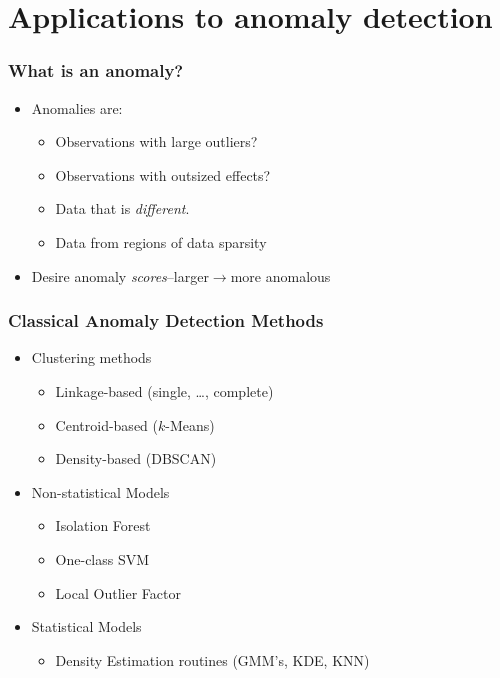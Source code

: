 \documentclass[aspectratio=169]{beamer}
\begin{document}
\section[Anomaly]{Applications to anomaly detection}

\begin{frame}
  \frametitle{What is an anomaly?}
  \begin{itemize}
    \item Anomalies are:
      \begin{itemize}
        \item Observations with large outliers?
        \item Observations with outsized effects?
        \item Data that is \emph{different}.
        \item Data from regions of data sparsity
      \end{itemize}
    \item Desire anomaly \emph{scores}--larger$\rightarrow$more anomalous
  \end{itemize}
\end{frame}

\begin{frame}
  \frametitle{Classical Anomaly Detection Methods}
  \begin{itemize}
    \item Clustering methods
      \begin{itemize}
        \item Linkage-based (single, \dots, complete)~\citep{ackerman2010}
        \item Centroid-based ($k$-Means)~\citep{hartigan1979} 
        \item Density-based (DBSCAN)~\citep{ester1996}
      \end{itemize}
    \item Non-statistical Models
      \begin{itemize}
        \item Isolation Forest~\citep{liu2000}
        \item One-class SVM~\citep{chang2011}
        \item Local Outlier Factor~\citep{breunig2000}
      \end{itemize}
    \item Statistical Models
      \begin{itemize}
        \item Density Estimation routines (GMM's, KDE, KNN)
      \end{itemize}
  \end{itemize}
\end{frame}
\end{document}
